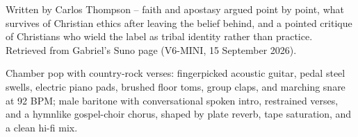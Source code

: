 
\label{sec:its-still-with-me}
\begin{notes}
Written by Carlos Thompson -- faith and apostasy argued point by point, what survives of Christian ethics after leaving the belief behind, and a pointed critique of Christians who wield the label as tribal identity rather than practice. Retrieved from Gabriel's Suno page (V6-MINI, 15 September 2026).
\end{notes}
\begin{style}
Chamber pop with country-rock verses: fingerpicked acoustic guitar, pedal steel swells, electric piano pads, brushed floor toms, group claps, and marching snare at 92 BPM; male baritone with conversational spoken intro, restrained verses, and a hymnlike gospel-choir chorus, shaped by plate reverb, tape saturation, and a clean hi-fi mix.
\end{style}
